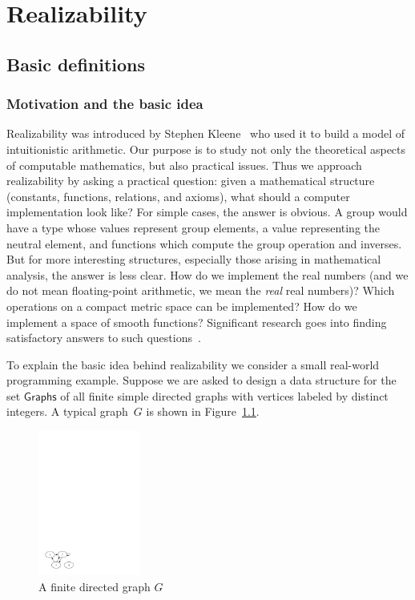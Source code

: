 \chapter{Realizability}
\label{chap:realizability}

\section{Basic definitions}
\label{sec:basic-definitions}

\subsection{Motivation and the basic idea}
\label{sec:realizability-basic-idea}

Realizability was introduced by Stephen Kleene~
who used it to build a model of intuitionistic arithmetic. Our purpose
is to study not only the theoretical aspects of computable
mathematics, but also practical issues. Thus we approach realizability
by asking a practical question: given a mathematical structure
(constants, functions, relations, and axioms), what should a computer
implementation look like? For simple cases, the answer is obvious. A
group would have a type whose values represent group elements, a value
representing the neutral element, and functions which compute the
group operation and inverses. But for more interesting structures,
especially those arising in mathematical analysis, the answer is less
clear. How do we implement the real numbers (and we do not mean
floating-point arithmetic, we mean the \emph{real} real numbers)?
Which operations on a compact metric space can be implemented? How do
we implement a space of smooth functions? Significant research goes
into finding satisfactory answers to such
questions~.

To explain the basic idea behind realizability we consider a small
real-world programming example. Suppose we are asked to design a data
structure for the set $\mathsf{Graphs}$ of all finite
simple directed graphs with vertices labeled by distinct
integers. A typical graph~$G$ is shown in Figure~\ref{fig:digraph}.

\begin{figure}[htp]
  \centering
  \includegraphics[width=0.3\textwidth]{digraph}
  \caption{A finite directed graph $G$}
  \label{fig:digraph}
\end{figure}

